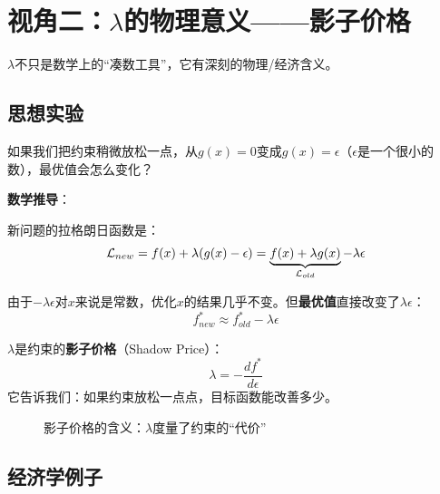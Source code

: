 

\section{视角二：$\lambda$的物理意义——影子价格}

$\lambda$不只是数学上的“凑数工具”，它有深刻的物理/经济含义。

\subsection{思想实验}

如果我们把约束稍微放松一点，从$g(x) = 0$变成$g(x) = \epsilon$（$\epsilon$是一个很小的数），最优值会怎么变化？

\textbf{数学推导}：

新问题的拉格朗日函数是：
\[
\mathcal{L}_{new} = f(x) + \lambda(g(x) - \epsilon) = \underbrace{f(x) + \lambda g(x)}_{\mathcal{L}_{old}} - \lambda \epsilon
\]

由于$-\lambda\epsilon$对$x$来说是常数，优化$x$的结果几乎不变。但\textbf{最优值}直接改变了$\lambda\epsilon$：
\[
f^*_{new} \approx f^*_{old} - \lambda \epsilon
\]

\begin{physicalmeaning}
$\lambda$是约束的\textbf{影子价格}（Shadow Price）：
\[
\lambda = -\frac{df^*}{d\epsilon}
\]
它告诉我们：如果约束放松一点点，目标函数能改善多少。
\end{physicalmeaning}

\begin{figure}[htbp]
\centering
{}
\caption{影子价格的含义：$\lambda$度量了约束的“代价”}
\end{figure}

\subsection{经济学例子}

